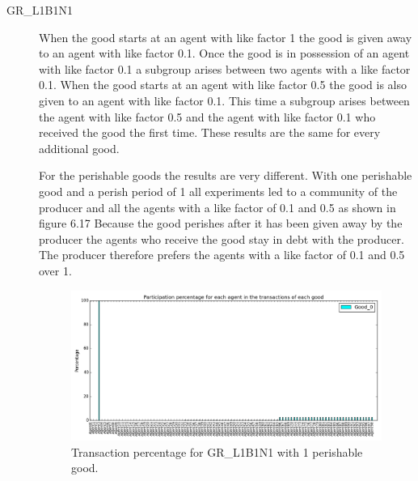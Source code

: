 \documentclass[twoside,openright]{uva-bachelor-thesis}
\begin{document}
\begin{description}
\item[GR\_L1B1N1] When the good starts at an agent with like factor 1 the good is given away to an agent with like factor 0.1. Once the good is in possession of an agent with like factor 0.1 a subgroup arises between two agents with a like factor 0.1. When the good starts at an agent with like factor 0.5 the good is also given to an agent with like factor 0.1. This time a subgroup arises between the agent with like factor 0.5 and the agent with like factor 0.1 who received the good the first time. These results are the same for every additional good.

For the perishable goods the results are very different. With one perishable good and a perish period of 1 all experiments led to a community of the producer and all the agents with a like factor of 0.1 and 0.5 as shown in figure 6.17 Because the good perishes after it has been given away by the producer the agents who receive the good stay in debt with the producer. The producer therefore prefers the agents with a like factor of 0.1 and 0.5 over 1. \\
\begin{figure}[h!]
\centering
\includegraphics[scale=0.4]{Simulation_figures/GR_L1B1N1/1perishable_1-1_15k}
\caption{Transaction percentage for GR\_L1B1N1 with 1 perishable good.}
\end{figure}


\end{description}
\end{document}
